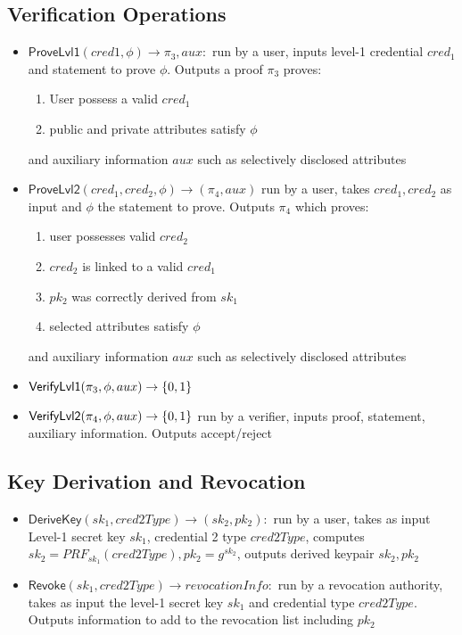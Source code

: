 \subsection{Verification Operations}
\begin{itemize}
     \item $\mathsf{ProveLvl1}(cred1, \phi) \to \pi_3, aux:$ run by a user, inputs level-1 credential $cred_1$ and statement to prove $\phi$. Outputs a proof $\pi_3$ proves:
     \begin{enumerate}
         \item User possess a valid $cred_1$
         \item public and private attributes satisfy $\phi$
     \end{enumerate}
     and auxiliary information $aux$ such as selectively disclosed attributes
     
     \item $\mathsf{ProveLvl2}(cred_1, cred_2, \phi) \to (\pi_4, aux)$ run by a user, takes $cred_1, cred_2$ as input and $\phi$ the statement to prove. Outputs $\pi_4$ which proves:
     \begin{enumerate}
         \item user possesses valid $cred_2$
         \item $cred_2$ is linked to a valid $cred_1$
         \item $pk_2$ was correctly derived from $sk_1$
         \item selected attributes satisfy $\phi$
     \end{enumerate}
     and auxiliary information $aux$ such as selectively disclosed attributes

     \item $\mathsf{VerifyLvl1}(\pi_3, \phi, aux) \to \{0,1\}$
     \item $\mathsf{VerifyLvl2}(\pi_4, \phi, aux) \to \{0,1\}$
     run by a verifier, inputs proof, statement, auxiliary information. Outputs accept/reject
\end{itemize}


\subsection{Key Derivation and Revocation}
\begin{itemize}
    \item $\mathsf{DeriveKey}(sk_1, cred2Type) \to (sk_2, pk_2): $ run by a user, takes as input Level-1 secret key $sk_1$, credential 2 type $cred2Type$, computes $sk_2 = PRF_{sk_1}(cred2Type), pk_2 = g^{sk_2}$, outputs derived keypair $sk_2, pk_2$
    
    \item $\mathsf{Revoke}(sk_1, cred2Type) \to revocationInfo: $ run by a revocation authority, takes as input the level-1 secret key $sk_1$ and credential type $cred2Type$. Outputs information to add to the revocation list including $pk_2$
\end{itemize}

